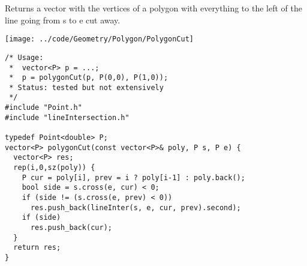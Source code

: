 \begin{minipage}{75mm}
Returns a vector with the vertices of a polygon with everything to the left of the line going from s to e cut away.
\end{minipage}
\begin{minipage}{15mm}
\vspace{-6mm}
\texttt{[image: ../code/Geometry/Polygon/PolygonCut]}
\vspace{-6mm}
\end{minipage}
\begin{verbatim}
/* Usage:
 *  vector<P> p = ...;
 *  p = polygonCut(p, P(0,0), P(1,0));
 * Status: tested but not extensively
 */
#include "Point.h"
#include "lineIntersection.h"

typedef Point<double> P;
vector<P> polygonCut(const vector<P>& poly, P s, P e) {
  vector<P> res;
  rep(i,0,sz(poly)) {
    P cur = poly[i], prev = i ? poly[i-1] : poly.back();
    bool side = s.cross(e, cur) < 0;
    if (side != (s.cross(e, prev) < 0))
      res.push_back(lineInter(s, e, cur, prev).second);
    if (side)
      res.push_back(cur);
  }
  return res;
}
\end{verbatim}
